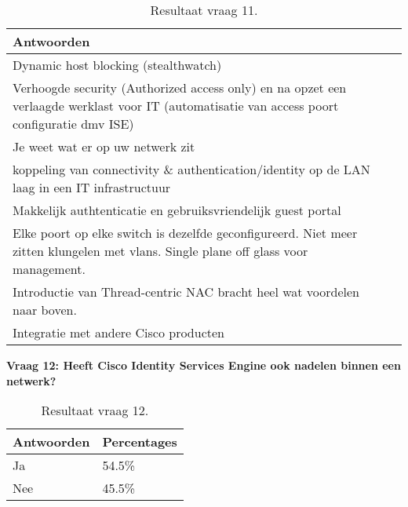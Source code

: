 \begin{table}[H]
	\begin{center}
		\setlength{}
		\noindent\begin{tabular}{p{\q}p{\q}}
		\hline
		\bf Antwoorden                                                                                                                              \\ \hline
		Dynamic host blocking (stealthwatch)                                                                                                         \\ \hline
		Verhoogde security (Authorized access only) en na opzet een verlaagde werklast voor IT (automatisatie van access poort configuratie dmv ISE) \\ \hline
		Je weet wat er op uw netwerk zit                                                                                                             \\ \hline
		koppeling van connectivity \& authentication/identity op de LAN laag in een IT infrastructuur                                                \\ \hline
		Makkelijk authtenticatie en gebruiksvriendelijk guest portal                                                                                 \\ \hline
		Elke poort op elke switch is dezelfde geconfigureerd.  Niet meer zitten klungelen met vlans. Single plane off glass voor management.         \\ \hline
		Introductie van Thread-centric NAC bracht heel wat voordelen naar boven.                                                                     \\ \hline
		Integratie met andere Cisco producten                                                                                                        \\ \hline                                                        
		\end{tabular}
		\caption{Resultaat vraag 11.}
	\end{center}
\end{table}

\textbf{Vraag 12: Heeft Cisco Identity Services Engine ook nadelen binnen een netwerk?}

\begin{table}[h!]
	\begin{center}
		\begin{tabular}{|l|l|}
			\hline
			\bf Antwoorden    & \bf Percentages \\ \hline
			Ja      & 54.5\% \\ \hline
			Nee     & 45.5\%    \\ \hline                                                      
		\end{tabular}
		\caption{Resultaat vraag 12.}
	\end{center}
\end{table}

